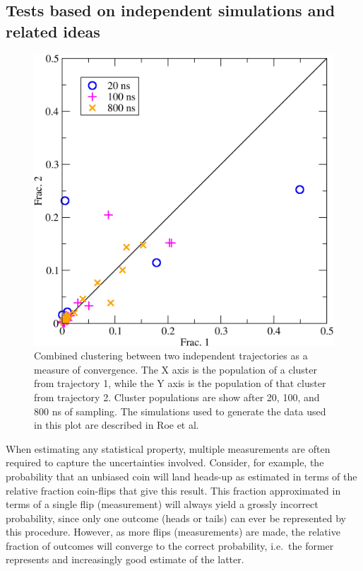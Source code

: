 \subsection{Tests based on independent simulations and related ideas}

\begin{figure}
  \centering
  \includegraphics[width=0.9\linewidth]{figures/combinedcluster}
  \caption{Combined clustering between two independent trajectories as a measure of convergence. The X axis is the population of a cluster from trajectory 1, while the Y axis is the population of that cluster from trajectory 2. Cluster populations are show after 20, 100, and 800 ns of sampling. The simulations used to generate the data used in this plot are described in Roe et al.\citep{Roe2014}}
  \label{f:combinedcluster} 
\end{figure}

When estimating any statistical property, multiple measurements are often required to capture the uncertainties involved. Consider, for example, the probability that an unbiased coin will land heads-up as estimated in terms of the relative fraction coin-flips that give this result.  This fraction approximated in terms of a single flip (measurement) will always yield a grossly incorrect probability, since only one outcome (heads or tails) can ever be represented by this procedure.  However, as more flips (measurements) are made, the relative fraction of outcomes will converge to the correct probability, i.e.\ the former represents and increasingly good estimate of the latter.  

